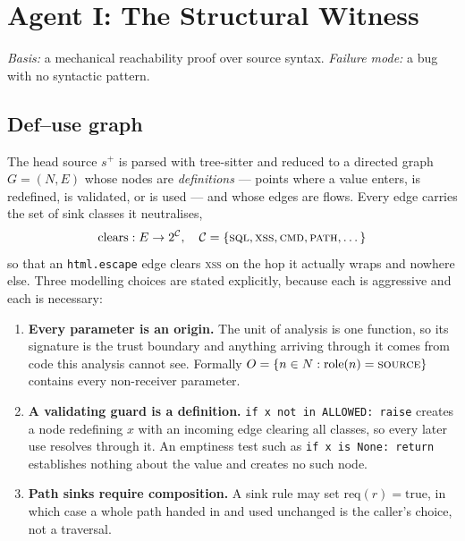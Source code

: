 \documentclass[conference]{IEEEtran}
\begin{document}
\section{Agent I: The Structural Witness}

\emph{Basis:} a mechanical reachability proof over source syntax. \emph{Failure mode:} a bug
with no syntactic pattern.

\subsection{Def--use graph}
The head source $s^{+}$ is parsed with tree-sitter and reduced to a directed graph $G=(N,E)$
whose nodes are \emph{definitions} --- points where a value enters, is redefined, is
validated, or is used --- and whose edges are flows. Every edge carries the set of sink
classes it neutralises,
\begin{equation}
\mathrm{clears}: E \rightarrow 2^{\mathcal{C}}, \quad
\mathcal{C}=\{\textsc{sql},\textsc{xss},\textsc{cmd},\textsc{path},\dots\}
\end{equation}
so that an \texttt{html.escape} edge clears \textsc{xss} on the hop it actually wraps and
nowhere else. Three modelling choices are stated explicitly, because each is aggressive and
each is necessary:

\begin{enumerate}
\item \textbf{Every parameter is an origin.} The unit of analysis is one function, so its
signature is the trust boundary and anything arriving through it comes from code this
analysis cannot see. Formally $O=\{n \in N : \mathrm{role}(n)=\textsc{source}\}$ contains
every non-receiver parameter.
\item \textbf{A validating guard is a definition.} \texttt{if x not in ALLOWED: raise}
creates a node redefining $x$ with an incoming edge clearing all classes, so every later use
resolves through it. An emptiness test such as \texttt{if x is None: return} establishes
nothing about the value and creates no such node.
\item \textbf{Path sinks require composition.} A sink rule may set
$\mathrm{req}(r)=\mathrm{true}$, in which case a whole path handed in and used unchanged is
the caller's choice, not a traversal.
\end{enumerate}
\end{document}
